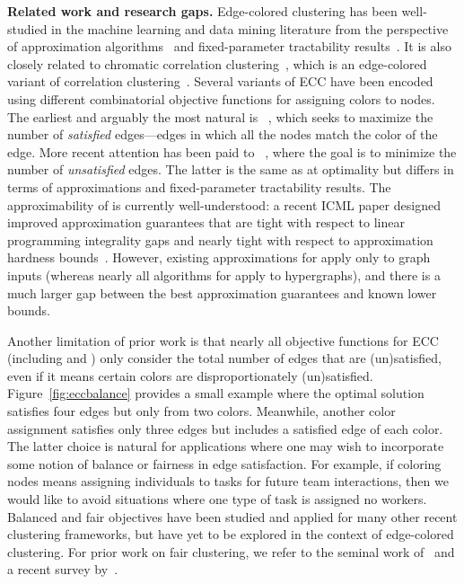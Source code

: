 \textbf{Related work and research gaps.}
Edge-colored clustering has been well-studied in the machine learning and data mining literature from the perspective of approximation algorithms~\cite{amburg2020clustering,amburg2022diverse,veldt2023optimal,crane2024overlapping,angel2016clustering} and fixed-parameter tractability results~\cite{kellerhals2023parameterized,cai2018alternating,crane2024overlapping}. It is also closely related to chromatic correlation clustering~\cite{bonchi2012chromatic,bonchi2015chromatic,anava2015improved,klodt2021color,xiu2022chromatic}, which is an edge-colored variant of correlation clustering~\cite{bansal2004correlation}.
Several variants of ECC have been encoded using different combinatorial objective functions for assigning colors to nodes. The earliest and arguably the most natural is \maxecc{}~\cite{angel2016clustering}, which seeks to maximize the number of \textit{satisfied} edges---edges in which all the nodes match the color of the edge. More recent attention has been paid to \minecc{}~\cite{amburg2020clustering}, where the goal is to minimize the number of \textit{unsatisfied} edges. The latter is the same as \maxecc{} at optimality but differs in terms of approximations and fixed-parameter tractability results.
The approximability of \minecc{} is currently well-understood: a recent ICML paper designed improved approximation guarantees that are tight with respect to linear programming integrality gaps and nearly tight with respect to approximation hardness bounds~\cite{veldt2023optimal}.
However, existing approximations for \maxecc{} apply only to graph inputs (whereas nearly all algorithms for \minecc{} apply to hypergraphs), and there is a much larger gap between the best approximation guarantees and known lower bounds.

Another limitation of prior work is that nearly all objective functions for ECC (including \minecc{} and \maxecc{}) only consider the total number of edges that are (un)satisfied, even if it means certain colors are disproportionately (un)satisfied. Figure~\ref{fig:eccbalance} provides a small example where the optimal  \minecc{} solution satisfies four edges but only from two colors. Meanwhile, another color assignment satisfies only three edges but includes a satisfied edge of each color. The latter choice is natural for applications where one may wish to incorporate some notion of balance or fairness in edge satisfaction. For example, if coloring nodes means assigning individuals to tasks for future team interactions, then we would like to avoid situations where one type of task is assigned no workers. Balanced and fair objectives have been studied and applied for many other recent clustering frameworks, but have yet to be explored in the context of edge-colored clustering. For prior work on fair clustering, we refer to the seminal work of~\citet{chierichetti2017fair} and a recent survey by~\citet{caton2024fairness}.

